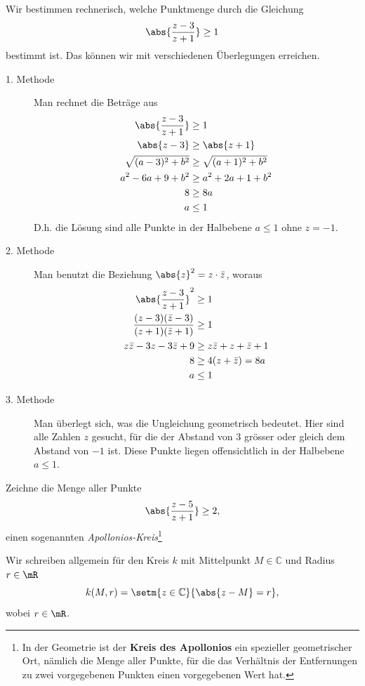 \documentclass[%
11pt,%
twoside,%
titlepage,%
german,%
headsepline%
]{scrartcl}
\begin{document}
\begin{bsp}
Wir bestimmen rechnerisch, welche Punktmenge durch die Gleichung
$$\abs{\frac{z-3}{z+1}}\geq1$$
bestimmt ist. Das k\"onnen wir mit verschiedenen \"Uberlegungen erreichen.

\begin{description}
\item[1. Methode] Man rechnet die Beträge aus
\begin{align*}
\abs{\frac{z-3}{z+1}}&\geq1\\
\abs{z-3}&\geq\abs{z+1}\\
\sqrt{(a-3)^2+b^2}&\geq\sqrt{(a+1)^2+b^2}\\
a^2-6a+9+b^2&\geq a^2+2a+1+b^2\\
8&\geq 8a\\
a&\leq1
\end{align*}
D.h. die L\"osung sind alle Punkte in der Halbebene $a\leq1$ ohne $z=-1$.
\item[2. Methode] Man benutzt die Beziehung $\abs{z}^2=z\cdot\bar{z}$, woraus
\begin{align*}
\abs{\frac{z-3}{z+1}}^2&\geq1\\
\frac{(z-3)(\bar{z}-3)}{(z+1)(\bar{z}+1)}&\geq1\\
z\bar{z}-3z-3\bar{z}+9&\geq z\bar{z}+z+\bar{z}+1\\
8&\geq 4(z+\bar{z})=8a\\
a&\leq1
\end{align*}
\item[3. Methode] Man \"uberlegt sich, was die Ungleichung geometrisch bedeutet. Hier sind alle Zahlen $z$ gesucht, f\"ur die der Abstand von $3$ gr\"osser oder gleich dem Abstand von $-1$ ist. Diese Punkte liegen offensichtlich in der Halbebene $a\leq1$.
\end{description}
\end{bsp}

\begin{ueb}
Zeichne die Menge aller Punkte
$$\abs{\frac{z-5}{z+1}}\geq2,$$
einen sogenannten \emph{Apollonios-Kreis}\footnote{In der Geometrie ist der \textbf{Kreis des Apollonios} ein spezieller geometrischer Ort, nämlich die Menge aller Punkte, f\"ur die das Verhältnis der Entfernungen zu zwei vorgegebenen Punkten einen vorgegebenen Wert hat.}
\end{ueb}

Wir schreiben allgemein f\"ur den Kreis
$k$ mit Mittelpunkt $M\in\mathbb{C}$ und Radius $r\in\mR$
$$k(M,r)=\setm{z\in\mathbb{C}}{\abs{z-M}=r},$$
wobei $r\in\mR$.
\end{document}
